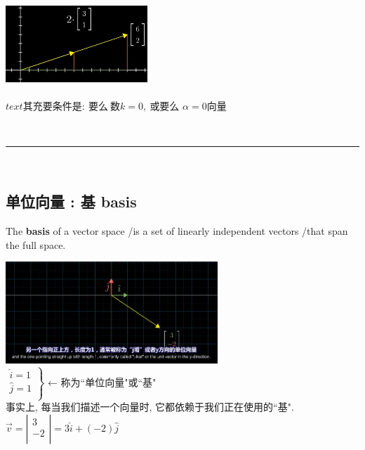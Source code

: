 \documentclass[UTF8]{ctexart}
\begin{document}
\includegraphics[width=0.4\textwidth]{img/0067.png}\\
\\


$text{其充要条件是:\ 要么\ 数}k=0,\ \text{或要么\ }\alpha =0\text{向量}$


~\\
\hrule
~\\








\subsection{单位向量 : 基 basis}

The \textbf{basis} of a vector space /is a set of linearly independent vectors /that span the full space.

\includegraphics[width=0.6\textwidth]{img/0068.png}\\

$\left. \begin{array}{r}
		\hat{i} = 1 \\
		\hat{j} = 1 \\
	\end{array} \right\}$ ← 称为``单位向量"或``基"\\

事实上, 每当我们描述一个向量时, 它都依赖于我们正在使用的``基".\\

$\vec{v}=\left| \begin{array}{l}
		3  \\
		-2 \\
	\end{array} \right|= 3 \hat{i} + (-2)\hat{j}$\\
\end{document}
